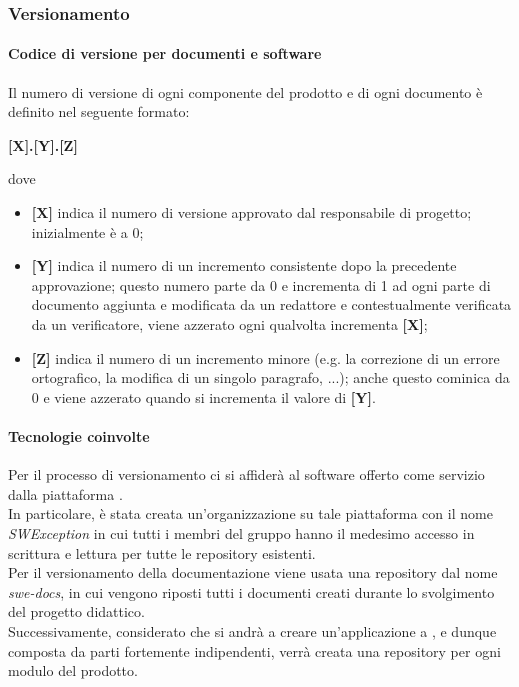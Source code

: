 \subsubsection{Versionamento}
\paragraph{Codice di versione per documenti e software}
Il numero di versione di ogni componente del prodotto e di ogni documento è definito nel seguente formato:
\begin{center}
    \textbf{[X].[Y].[Z]}
\end{center}
dove
\begin{itemize}
    \item \textbf{[X]} indica il numero di versione approvato dal responsabile di progetto; inizialmente è a 0;
    \item \textbf{[Y]} indica il numero di un incremento consistente dopo la precedente approvazione; questo numero parte da
          0 e incrementa di 1 ad ogni parte di documento aggiunta e modificata da un redattore e contestualmente verificata da un verificatore,
          viene azzerato ogni qualvolta incrementa \textbf{[X]};
    \item \textbf{[Z]} indica il numero di un incremento minore (e.g. la correzione di un errore ortografico, la modifica di un singolo paragrafo, ...);
          anche questo cominica da 0 e viene azzerato quando si incrementa il valore di \textbf{[Y]}.
\end{itemize}

\paragraph{Tecnologie coinvolte}
Per il processo di versionamento ci si affiderà al software  offerto come servizio dalla piattaforma .\\
In particolare, è stata creata un'organizzazione su tale piattaforma con il nome \textit{SWException} in cui tutti i membri del gruppo
hanno il medesimo accesso in scrittura e lettura per tutte le repository esistenti.\\
Per il versionamento della documentazione viene usata una repository dal nome \textit{swe-docs}, in cui vengono riposti tutti i
documenti creati durante lo svolgimento del progetto didattico.\\
Successivamente,  considerato che si andrà a creare un'applicazione a , e dunque composta da parti fortemente indipendenti,
verrà creata una repository per ogni modulo del prodotto.

